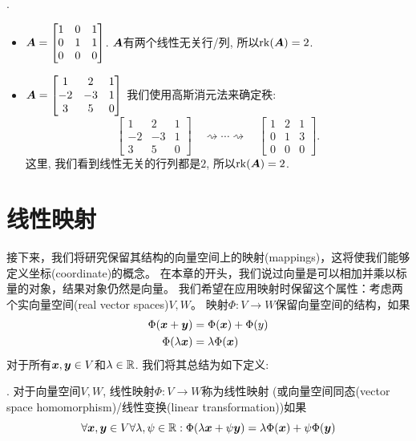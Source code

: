 \begin{example}[秩].\\
    \begin{itemize}
        \item $\boldsymbol{A} =
        \begin{bmatrix}
            1 & 0 & 1 \\
            0 & 1 & 1 \\
            0 & 0 & 0
        \end{bmatrix}$.
        $\boldsymbol{A}$有两个线性无关行/列, 所以$\mathrm{rk}(\boldsymbol{A}) = 2$.
        \item $\boldsymbol{A} =
        \begin{bmatrix}
            1 & 2 & 1 \\
            -2 & -3 & 1 \\
            3 & 5 & 0
        \end{bmatrix}$
        我们使用高斯消元法来确定秩:
        \begin{equation}
            \begin{bmatrix}
                1 & 2 & 1 \\
                -2 & -3 & 1 \\
                3 & 5 & 0
            \end{bmatrix}
            \quad \rightsquigarrow\cdots\rightsquigarrow\quad
            \begin{bmatrix}
                1 & 2 & 1 \\
                0 & 1 & 3 \\
                0 & 0 & 0
            \end{bmatrix}.
        \end{equation}
        这里, 我们看到线性无关的行列都是$2$, 所以$\mathrm{rk}(\boldsymbol{A}) = 2$.
    \end{itemize}
\end{example}

\section{线性映射}

接下来，我们将研究保留其结构的向量空间上的映射(mappings)，这将使我们能够定义坐标(coordinate)的概念。
在本章的开头，我们说过向量是可以相加并乘以标量的对象，结果对象仍然是向量。
我们希望在应用映射时保留这个属性：考虑两个实向量空间(real vector spaces)$V, W$。
映射$\Phi : V \rightarrow W$保留向量空间的结构，如果
\begin{align}
    \Phi(\boldsymbol{x} + \boldsymbol{y}) &= \Phi(\boldsymbol{x}) + \Phi(y) \\
    \Phi(\lambda\boldsymbol{x}) &= \lambda\Phi(\boldsymbol{x})
\end{align}
对于所有$\boldsymbol{x},\boldsymbol{y} \in V$和$\lambda \in \mathbb{R}$.
我们将其总结为如下定义:
\begin{definition}[线性映射].
   对于向量空间$V,W$, 线性映射$\Phi:V\rightarrow W$称为线性映射
   (或向量空间同态(vector space homomorphism)/线性变换(linear transformation))如果
   \begin{equation}
       \forall \boldsymbol{x},\boldsymbol{y} \in V \forall \lambda,\psi \in \mathbb{R}:
       \Phi(\lambda\boldsymbol{x} + \psi \boldsymbol{y}) = \lambda \Phi(\boldsymbol{x}) + \psi \Phi(\boldsymbol{y})
   \end{equation}
\end{definition}

